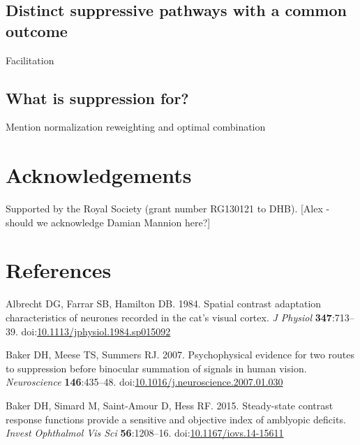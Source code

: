 \documentclass[]{article}
\begin{document}
\hypertarget{distinct-suppressive-pathways-with-a-common-outcome}{%
\subsection{Distinct suppressive pathways with a common outcome}\label{distinct-suppressive-pathways-with-a-common-outcome}}

Facilitation

\hypertarget{what-is-suppression-for}{%
\subsection{What is suppression for?}\label{what-is-suppression-for}}

Mention normalization reweighting and optimal combination

\hypertarget{acknowledgements}{%
\section{Acknowledgements}\label{acknowledgements}}

Supported by the Royal Society (grant number RG130121 to DHB). {[}Alex - should we acknowledge Damian Mannion here?{]}

\hypertarget{references}{%
\section*{References}\label{references}}

\hypertarget{refs}{}
\leavevmode\hypertarget{ref-Albrecht1984}{}%
Albrecht DG, Farrar SB, Hamilton DB. 1984. Spatial contrast adaptation characteristics of neurones recorded in the cat's visual cortex. \emph{J Physiol} \textbf{347}:713--39. doi:\href{https://doi.org/10.1113/jphysiol.1984.sp015092}{10.1113/jphysiol.1984.sp015092}

\leavevmode\hypertarget{ref-Baker2007}{}%
Baker DH, Meese TS, Summers RJ. 2007. Psychophysical evidence for two routes to suppression before binocular summation of signals in human vision. \emph{Neuroscience} \textbf{146}:435--48. doi:\href{https://doi.org/10.1016/j.neuroscience.2007.01.030}{10.1016/j.neuroscience.2007.01.030}

\leavevmode\hypertarget{ref-Baker2015}{}%
Baker DH, Simard M, Saint-Amour D, Hess RF. 2015. Steady-state contrast response functions provide a sensitive and objective index of amblyopic deficits. \emph{Invest Ophthalmol Vis Sci} \textbf{56}:1208--16. doi:\href{https://doi.org/10.1167/iovs.14-15611}{10.1167/iovs.14-15611}
\end{document}
